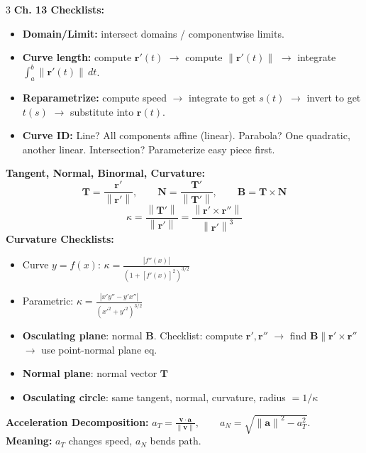 \documentclass[12pt, landscape]{article}
\newcommand{\vct}[1]{\bm{#1}}
\newcommand{\norm}[1]{\left\lVert#1\right\rVert}
\newcommand{\abs}[1]{\left\lvert#1\right\rvert}
\newcommand{\dotp}{\!\cdot\!}
\begin{document}
\begin{multicols}{3}
		\textbf{Ch. 13 Checklists:}
		\begin{itemize}
			\item \textbf{Domain/Limit:} intersect domains / componentwise limits.
			\item \textbf{Curve length:} compute $\vct r'(t)$ $\to$ compute $\norm{\vct r'(t)}$ $\to$ integrate $\int_a^b \norm{\vct r'(t)}\,dt$.
			\item \textbf{Reparametrize:} compute speed $\to$ integrate to get $s(t)$ $\to$ invert to get $t(s)$ $\to$ substitute into $\vct r(t)$.
			\item \textbf{Curve ID:} Line? All components affine (linear). Parabola? One quadratic, another linear. Intersection? Parameterize easy piece first.
		\end{itemize}
		
		\textbf{Tangent, Normal, Binormal, Curvature:}
		\[
		\vct T=\frac{\vct r'}{\norm{\vct r'}},\qquad \vct N=\frac{\vct T'}{\norm{\vct T'}},\qquad \vct B=\vct T\times \vct N
		\]
		\[
		\kappa=\frac{\norm{\vct T'}}{\norm{\vct r'}}=
		\frac{\norm{\vct r'\times \vct r''}}{\norm{\vct r'}^3}
		\]
		\textbf{Curvature Checklists:}
		\begin{itemize}
			\item Curve $y=f(x)$: $\kappa=\frac{\abs{f''(x)}}{(1+[f'(x)]^2)^{3/2}}$
			\item Parametric: $\kappa=\frac{\abs{x'y''-y'x''}}{(x'^2+y'^2)^{3/2}}$
		\end{itemize}
		
		\begin{itemize}
			\item \textbf{Osculating plane}: normal $\vct B$. Checklist: compute $\vct r',\vct r''$ $\to$ find $\vct B\parallel \vct r'\times \vct r''$ $\to$ use point-normal plane eq.
			\item \textbf{Normal plane}: normal vector $\vct T$
			\item \textbf{Osculating circle}: same tangent, normal, curvature, radius $=1/\kappa$
		\end{itemize}
		
		\textbf{Acceleration Decomposition:}
		$a_T=\frac{\vct v\dotp \vct a}{\norm{\vct v}},\qquad a_N=\sqrt{\norm{\vct a}^2-a_T^2}$.\\
		\textbf{Meaning:} $a_T$ changes speed, $a_N$ bends path.
		

\end{multicols}
\end{document}
